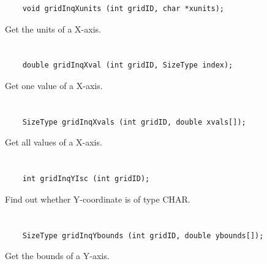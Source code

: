 \begin{verbatim}
    void gridInqXunits (int gridID, char *xunits);
\end{verbatim}

Get the units of a X-axis.


\section*{\tt {}}

\begin{verbatim}
    double gridInqXval (int gridID, SizeType index);
\end{verbatim}

Get one value of a X-axis.


\section*{\tt {}}

\begin{verbatim}
    SizeType gridInqXvals (int gridID, double xvals[]);
\end{verbatim}

Get all values of a X-axis.


\section*{\tt {}}

\begin{verbatim}
    int gridInqYIsc (int gridID);
\end{verbatim}

Find out whether Y-coordinate is of type CHAR.


\section*{\tt {}}

\begin{verbatim}
    SizeType gridInqYbounds (int gridID, double ybounds[]);
\end{verbatim}

Get the bounds of a Y-axis.


\section*{\tt {}}

